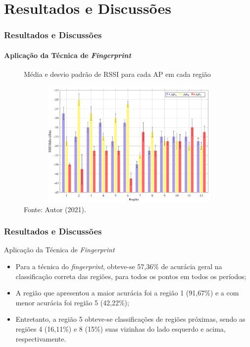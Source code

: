 \documentclass[xcolor={dvipsnames,svgnames,table}]{beamer}
\begin{document}
	\section{Resultados e Discussões}
	\label{resultados-discussoes}
	\begin{frame}
		\frametitle{Resultados e Discussões}
		\framesubtitle{Aplicação da Técnica de \textit{Fingerprint}}
		\begin{figure}
			\caption{Média e desvio padrão de RSSI para cada AP em cada região}
			\vspace{-5pt}
			\centering
			\includegraphics[width=12cm, height=6.2cm]{imgs/grafico_rssi.PNG}
			\vspace{-12pt}
			\caption*{\tiny{Fonte: Autor (2021).}}
		\end{figure}
	\end{frame}
	
	\begin{frame}
		\frametitle{Resultados e Discussões}
		\begin{block}{Aplicação da Técnica de \textit{Fingerprint}}
			\begin{itemize}[label=\textcolor{black}{\textbullet}, left=5pt]
				\justifying
				\item Para a técnica do \textit{fingerprint}, obteve-se 57,36\% de acurácia geral na classificação correta das regiões, para todos os pontos em todos os períodos;
				\item A região que apresentou a maior acurácia foi a região 1 (91,67\%) e a com menor acurácia foi região 5 (42,22\%);
				\item Entretanto, a região 5 obteve-se classificações de regiões próximas, sendo as regiões 4 (16,11\%) e 8 (15\%) suas vizinhas do lado esquerdo e acima, respectivamente.
			\end{itemize}
		\end{block}
	\end{frame}
	
\end{document}
